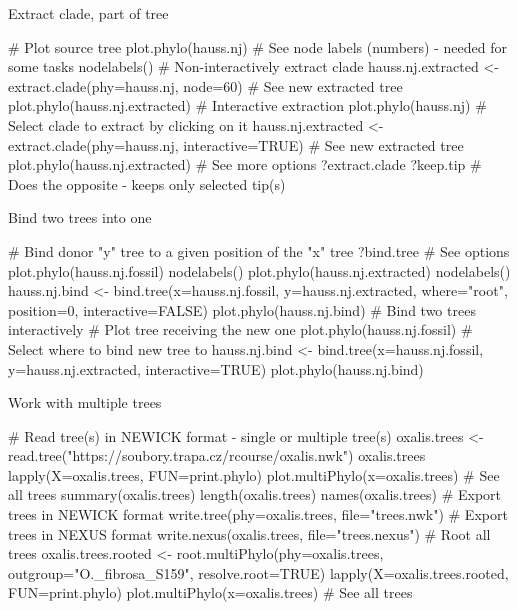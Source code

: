 \documentclass[compress, xelatex, 11pt, xcolor=svgnames, aspectratio=169,
	hyperref={
		bookmarks=true,
		unicode=true,
		colorlinks=true,
		pdftitle={Molecular data in R},
		plainpages=false,
		pdfauthor={Vojtech Zeisek},
		pdfsubject={Course about phylogeny and evolution in R},
		pdfcreator={XeLaTeX},
		pdfkeywords={R, evolution, phylogeny, molecular data},
		linkcolor=Crimson, %
		anchorcolor=Magenta, %
		citecolor=Magenta, %
		filecolor=Magenta, %
		menucolor=Magenta, %
		urlcolor=DodgerBlue, %
		},
	url={hyphens, lowtilde} %
	]{beamer}
\begin{document}
\begin{frame}[fragile]{Extract clade, part of tree}
	\begin{spluscode}
    # Plot source tree
    plot.phylo(hauss.nj)
    # See node labels (numbers) - needed for some tasks
    nodelabels()
    # Non-interactively extract clade
    hauss.nj.extracted <- extract.clade(phy=hauss.nj, node=60)
    # See new extracted tree
    plot.phylo(hauss.nj.extracted)
    # Interactive extraction
    plot.phylo(hauss.nj)
    # Select clade to extract by clicking on it
    hauss.nj.extracted <- extract.clade(phy=hauss.nj, interactive=TRUE)
    # See new extracted tree
    plot.phylo(hauss.nj.extracted)
    # See more options
    ?extract.clade
    ?keep.tip # Does the opposite - keeps only selected tip(s)
	\end{spluscode}
\end{frame}

\begin{frame}[fragile]{Bind two trees into one}
	\begin{spluscode}
    # Bind donor "y" tree to a given position of the "x" tree
    ?bind.tree # See options
    plot.phylo(hauss.nj.fossil)
    nodelabels()
    plot.phylo(hauss.nj.extracted)
    nodelabels()
    hauss.nj.bind <- bind.tree(x=hauss.nj.fossil, y=hauss.nj.extracted,
      where="root", position=0, interactive=FALSE)
    plot.phylo(hauss.nj.bind)
    # Bind two trees interactively
    # Plot tree receiving the new one
    plot.phylo(hauss.nj.fossil)
    # Select where to bind new tree to
    hauss.nj.bind <- bind.tree(x=hauss.nj.fossil, y=hauss.nj.extracted,
      interactive=TRUE)
    plot.phylo(hauss.nj.bind)
	\end{spluscode}
\end{frame}

\begin{frame}[fragile]{Work with multiple trees}
	\begin{spluscode}
    # Read tree(s) in NEWICK format - single or multiple tree(s)
    oxalis.trees <- read.tree("https://soubory.trapa.cz/rcourse/oxalis.nwk")
    oxalis.trees
    lapply(X=oxalis.trees, FUN=print.phylo)
    plot.multiPhylo(x=oxalis.trees) # See all trees
    summary(oxalis.trees)
    length(oxalis.trees)
    names(oxalis.trees)
    # Export trees in NEWICK format
    write.tree(phy=oxalis.trees, file="trees.nwk")
    # Export trees in NEXUS format
    write.nexus(oxalis.trees, file="trees.nexus")
    # Root all trees
    oxalis.trees.rooted <- root.multiPhylo(phy=oxalis.trees,
      outgroup="O._fibrosa_S159", resolve.root=TRUE)
    lapply(X=oxalis.trees.rooted, FUN=print.phylo)
    plot.multiPhylo(x=oxalis.trees) # See all trees
	\end{spluscode}
\end{frame}
\end{document}
